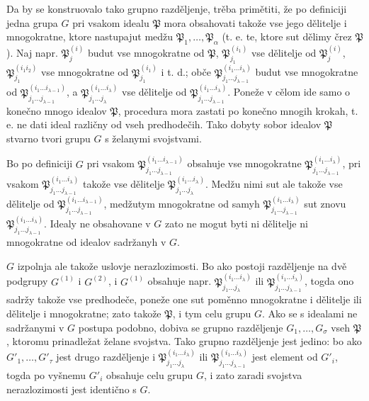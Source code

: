 \documentclass[11pt]{article}
\newcommand{\ideal}[1]{\mathfrak{#1}}
\begin{document}
Da by se konstruovalo tako grupno razděljenje, trěba primětiti, že po definiciji jedna grupa \(G\) pri vsakom idealu \(\ideal P\) mora obsahovati takože vse jego dělitelje i mnogokratne, ktore nastupajut medžu \(\ideal P_1,\ldots,\ideal P_\alpha\) (t. e. te, ktore sut dělimy črez \(\ideal P\)). Naj napr. \(\ideal P_j^{(i)}\) budut vse mnogokratne od \(\ideal P\), \(\ideal P_{j_1}^{(i_1)}\) vse dělitelje od \(\ideal P_j^{(i)}\), \(\ideal P_{j_1}^{(i_1 i_2)}\) vse mnogokratne od \(\ideal P_{j_1}^{(i_1)}\) i t. d.; obče \(\ideal P_{j_1\ldots j_{\lambda-1}}^{(i_1\ldots i_\lambda)}\) budut vse mnogokratne od \(\ideal P_{j_1\ldots j_{\lambda-1}}^{(i_1\ldots i_{\lambda-1})}\), a \(\ideal P_{j_1\ldots j_\lambda}^{(i_1\ldots i_\lambda)}\) vse dělitelje od \(\ideal P_{j_1\ldots j_{\lambda-1}}^{(i_1\ldots i_\lambda)}\). Poneže v cělom ide samo o konečno mnogo idealov \(\ideal P\), procedura mora zastati po konečno mnogih krokah, t. e. ne dati ideal različny od vseh predhodečih. Tako dobyty sobor idealov \(\ideal P\) stvarno tvori grupu \(G\) s želanymi svojstvami.

Bo po definiciji \(G\) pri vsakom \(\ideal P_{j_1\ldots j_{\lambda-1}}^{(i_1\ldots i_{\lambda-1})}\) obsahuje vse mnogokratne \(\ideal P_{j_1\ldots j_{\lambda-1}}^{(i_1\ldots i_\lambda)}\), pri vsakom \(\ideal P_{j_1\ldots j_{\lambda-1}}^{(i_1\ldots i_\lambda)}\) takože vse dělitelje \(\ideal P_{j_1\ldots j_\lambda}^{(i_1\ldots i_\lambda)}\). Medžu nimi sut ale takože vse dělitelje od \(\ideal P_{j_1\ldots j_{\lambda-1}}^{(i_1\ldots i_{\lambda-1})}\), medžutym mnogokratne od samyh \(\ideal P_{j_1\ldots j_{\lambda-1}}^{(i_1\ldots i_\lambda)}\) sut znovu \(\ideal P_{j_1\ldots j_{\lambda-1}}^{(i_1\ldots i_\lambda)}\). Idealy ne obsahovane v \(G\) zato ne mogut byti ni dělitelje ni mnogokratne od idealov sadržanyh v \(G\).

\(G\) izpolnja ale takože uslovje nerazlozimosti. Bo ako postoji razděljenje na dvě podgrupy \(G^{(1)}\) i \(G^{(2)}\), i \(G^{(1)}\) obsahuje napr. \(\ideal P_{j_1\ldots j_\lambda}^{(i_1\ldots i_\lambda)}\) ili \(\ideal P_{j_1\ldots j_{\lambda-1}}^{(i_1\ldots i_\lambda)}\), togda ono sadržy takože vse predhodeče, poneže one sut poměnno mnogokratne i dělitelje ili dělitelje i mnogokratne; zato takože \(\ideal P\), i tym celu grupu \(G\). Ako se s idealami ne sadržanymi v \(G\) postupa podobno, dobiva se grupno razděljenje \(G_1,\ldots,G_\sigma\) vseh \(\ideal P\), ktoromu prinadležat želane svojstva. Tako grupno razděljenje jest jedino: bo ako \(G'_1,\ldots,G'_\tau\) jest drugo razděljenje i \(\ideal P_{j_1\ldots j_\lambda}^{(i_1\ldots i_\lambda)}\) ili \(\ideal P_{j_1\ldots j_{\lambda-1}}^{(i_1\ldots i_\lambda)}\) jest element od \(G'_i\), togda po vyšnemu \(G'_i\) obsahuje celu grupu \(G\), i zato zaradi svojstva nerazlozimosti jest identično s \(G\).
\end{document}
